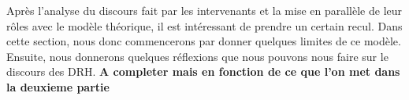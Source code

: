 Après l'analyse du discours fait par les intervenants et la mise en parallèle de leur rôles avec le modèle théorique, il est intéressant de prendre un certain recul. Dans cette section, nous donc commencerons par donner quelques limites de ce modèle. Ensuite, nous donnerons quelques  réflexions que nous pouvons nous faire sur le discours des DRH. \textbf{A completer mais en fonction de ce que l'on met dans la deuxieme partie}